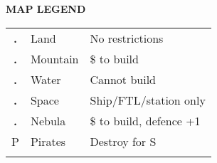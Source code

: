 \begin{flushleft}
\textbf{MAP LEGEND}
\end{flushleft}
\begin{tabular}{|c|ll}
\hhline{-}
\cellcolor{land}\textbf{.} & Land
                           & {\color{supplemental} No restrictions}       \\ \hhline{-}
\cellcolor{mountain}\textbf{.} & Mountain
                           & {\color{supplemental} \$ to build}           \\ \hhline{-}
\cellcolor{water}\textbf{.} & Water
                           & {\color{supplemental} Cannot build}          \\ \hhline{-}
\cellcolor{space}\textcolor{stars}{\textbf{.}}            & Space
                           & {\color{supplemental} Ship/FTL/station only} \\ \hhline{-}
\cellcolor{nebula}\textcolor{stars}{\textbf{.}} & Nebula
                           & {\color{supplemental} \$ to build, defence +1}       \\ \hhline{-}
P & Pirates
                           & {\color{supplemental} Destroy for S}         \\ \hhline{-}
\end{tabular}
